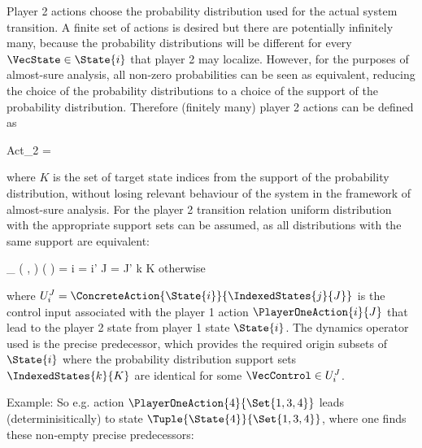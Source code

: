     Player 2 actions choose the probability distribution used for the actual system transition.
    A finite set of actions is desired but there are potentially infinitely many, because the probability distributions will be different for every $\VecState \in \State{i}$ that player 2 may localize.
    However, for the purposes of almost-sure analysis, all non-zero probabilities can be seen as equivalent, reducing the choice of the probability distributions to a choice of the support of the probability distribution. %
    Therefore (finitely many) player 2 actions can be defined as

    \startformula
        Act_2 =  \EndComma
    \stopformula

    where $K$ is the set of target state indices from the support of the probability distribution, without losing relevant behaviour of the system in the framework of almost-sure analysis.
    For the player 2 transition relation uniform distribution with the appropriate support sets can be assumed, as all distributions with the same support are equivalent:

    \startformula
        \Transition_\GameGraph
            \Big( ,  \Big)
            \Big(  \Big)
        = \startmathcases
            \NC \displaystyle{}
            \MC \startgathered
                    \NC \StartIf i = i' \MidAnd J = J' \MidAnd k \in K
                    \NR
                    \NC \quad \MidAnd {} \neq \emptyset
                    \NR
                \stopgathered
            \NR
            \NC otherwise \EndComma
            \NR
        \stopmathcases
    \stopformula

    where $U_i^J = \ConcreteAction{\State{i}}{\IndexedStates{j}{J}}$ is the control input associated with the player 1 action $\PlayerOneAction{i}{J}$ that lead to the player 2 state from player 1 state $\State{i}$.
    The dynamics operator used is the precise predecessor, which provides the required origin subsets of $\State{i}$ where the probability distribution support sets $\IndexedStates{k}{K}$ are identical for some $\VecControl \in U_i^J$.

    Example: %
    So e.g. action $\PlayerOneAction{4}{\Set{1, 3, 4}}$ leads (determinisitically) to state $\Tuple{\State{4}}{\Set{1, 3, 4}}$, where one finds these non-empty precise predecessors:


